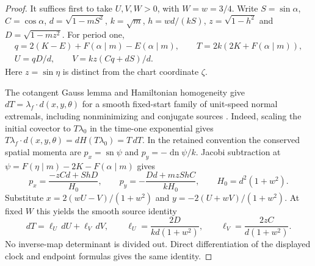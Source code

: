 \documentclass[11pt,a4paper]{article}
\theoremstyle{remark}\newtheorem{remark}[theorem]{Remark}
\newcommand{\sn}{\operatorname{sn}}
\newcommand{\dn}{\operatorname{dn}}
\begin{document}
\begin{proof}
It suffices first to take $U,V,W>0$, with $W=w=3/4$. Write
$S=\sin\alpha$, $C=\cos\alpha$, $d=\sqrt{1-mS^2}$, $k=\sqrt m$,
$h=wd/(kS)$, $z=\sqrt{1-h^2}$ and $D=\sqrt{1-mz^2}$.
For period one,
\[
 \begin{gathered}
 q=2(K-E)+F(\alpha\mid m)-E(\alpha\mid m),\qquad
 T=2k(2K+F(\alpha\mid m)),\\
 U=qD/d,\qquad V=kz(Cq+dS)/d.
 \end{gathered}
\]
Here $z=\sin\eta$ is distinct from the chart coordinate $\zeta$.

The cotangent Gauss lemma and Hamiltonian homogeneity give
$dT=\lambda_f\cdot d(x,y,\theta)$ for a smooth fixed-start family of
unit-speed normal extremals, including nonminimizing and conjugate
sources \cite[Section 8.6]{ABB}. Indeed, scaling the initial covector
to $T\lambda_0$ in the time-one exponential gives
$T\lambda_f\cdot d(x,y,\theta)=dH(T\lambda_0)=T\,dT$.
In the retained convention the conserved spatial momenta are
$p_x=\sn\psi$ and $p_y=-\dn\psi/k$. Jacobi subtraction at
$\psi=F(\eta\mid m)-2K-F(\alpha\mid m)$ gives
\[
 p_x=\frac{-zCd+ShD}{H_0},\qquad
 p_y=-\frac{Dd+mzShC}{kH_0},\qquad H_0=d^2(1+w^2).
\]
Substitute $x=2(wU-V)/(1+w^2)$ and $y=-2(U+wV)/(1+w^2)$.
At fixed $W$ this yields the smooth source identity
\begin{equation}\label{eq:window-first-variation}
 dT=\ell_U\,dU+\ell_V\,dV,\qquad
 \ell_U=\frac{2D}{kd(1+w^2)},\qquad
 \ell_V=\frac{2zC}{d(1+w^2)}.
\end{equation}
No inverse-map determinant is divided out. Direct differentiation of
the displayed clock and endpoint formulas gives the same identity.


\end{proof}
\end{document}
